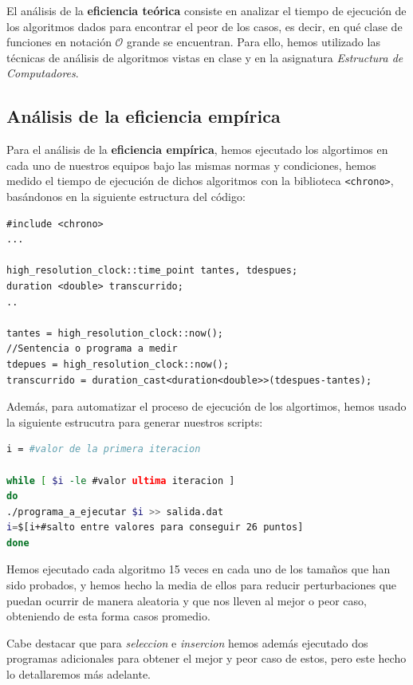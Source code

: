 \documentclass[10pt,a4paper]{article}
\begin{document}
El análisis de la \textbf{eficiencia teórica} consiste en analizar el tiempo de ejecución de los algoritmos dados para encontrar el peor de los casos, es decir, en qué clase de funciones en notación \(\mathcal{O}\) grande se encuentran. Para ello, hemos utilizado las técnicas de análisis de algoritmos vistas en clase y en la asignatura \textit{Estructura de Computadores}.

\subsection{Análisis de la eficiencia empírica}

Para el análisis de la \textbf{eficiencia empírica}, hemos ejecutado los algortimos en cada uno de nuestros equipos bajo las mismas normas y condiciones, hemos medido el tiempo de ejecución de dichos algoritmos con la biblioteca \texttt{<chrono>}, basándonos en la siguiente estructura del código:

\begin{lstlisting}
#include <chrono>
...

high_resolution_clock::time_point tantes, tdespues;
duration <double> transcurrido;
..

tantes = high_resolution_clock::now();
//Sentencia o programa a medir
tdepues = high_resolution_clock::now();
transcurrido = duration_cast<duration<double>>(tdespues-tantes);
\end{lstlisting}

Además, para automatizar el proceso de ejecución de los algortimos, hemos usado la siguiente estrucutra para generar nuestros scripts:
\begin{lstlisting}[language=bash]
i = #valor de la primera iteracion

while [ $i -le #valor ultima iteracion ]
do
./programa_a_ejecutar $i >> salida.dat
i=$[i+#salto entre valores para conseguir 26 puntos]
done
\end{lstlisting}

Hemos ejecutado cada algoritmo 15 veces en cada uno de los tamaños que han sido probados, y hemos hecho la media de ellos para reducir perturbaciones que puedan ocurrir de manera aleatoria y que nos lleven al mejor o peor caso, obteniendo de esta forma casos promedio. 

Cabe destacar que para \textit{seleccion} e \textit{insercion} hemos además ejecutado dos programas adicionales para obtener el mejor y peor caso de estos, pero este hecho lo detallaremos más adelante. \\
\end{document}
